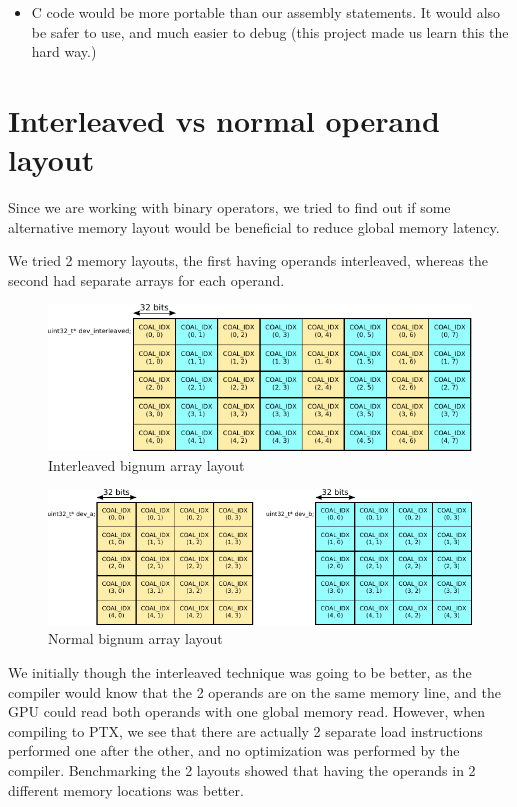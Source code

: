 \documentclass[12pt, a4paper]{report}
\begin{document}
\begin{sloppypar}
\begin{itemize}
\item C code would be more portable than our assembly statements.
It would also be safer to use, and much easier to debug (this project made us
learn this the hard way.)
\end{itemize}

\section{Interleaved vs normal operand layout}
Since we are working with binary operators, we tried to find out if some alternative
memory layout would be beneficial to reduce global memory latency.

We tried 2 memory layouts, the first having operands interleaved, whereas the
second had separate arrays for each operand.

\begin{figure}[h]
\centering
\includegraphics[scale=1.0]{figs/interleaved_bignum_array_layout}
\caption{Interleaved bignum array layout}
\label{fig:interleaved_bignum_array_layout}
\end{figure}

\begin{figure}[h]
\centering
\includegraphics[scale=1.0]{figs/bignum_array_layout}
\caption{Normal bignum array layout}
\label{fig:bignum_array_layout}
\end{figure}

We initially though the interleaved technique was going to be better, as the
compiler would know that the 2 operands are on the same memory line, and the GPU could
read both operands with one global memory read.
However, when compiling to PTX, we
see that there are actually 2 separate load instructions performed one after the
other, and no optimization was performed by the compiler.
Benchmarking the 2 layouts showed that having the operands in 2 different memory locations was better.


\end{sloppypar}
\end{document}
